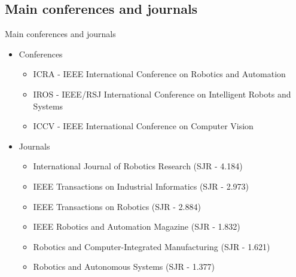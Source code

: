 \subsection{Main conferences and journals}
\begin{frame}{Main conferences and journals}
	\begin{itemize}
		\item Conferences
		\begin{itemize}
			\item ICRA - IEEE International Conference on Robotics and Automation
			\item IROS - IEEE/RSJ International Conference on Intelligent Robots and Systems
			\item ICCV - IEEE International Conference on Computer Vision
		\end{itemize}
		\item Journals
		\begin{itemize}
			\item International Journal of Robotics Research (SJR - 4.184)
			\item IEEE Transactions on Industrial Informatics (SJR - 2.973)
			\item IEEE Transactions on Robotics (SJR - 2.884)
			\item IEEE Robotics and Automation Magazine (SJR - 1.832)
			\item Robotics and Computer-Integrated Manufacturing (SJR - 1.621)
			\item Robotics and Autonomous Systems (SJR - 1.377)
		\end{itemize}
	\end{itemize}

\end{frame}

